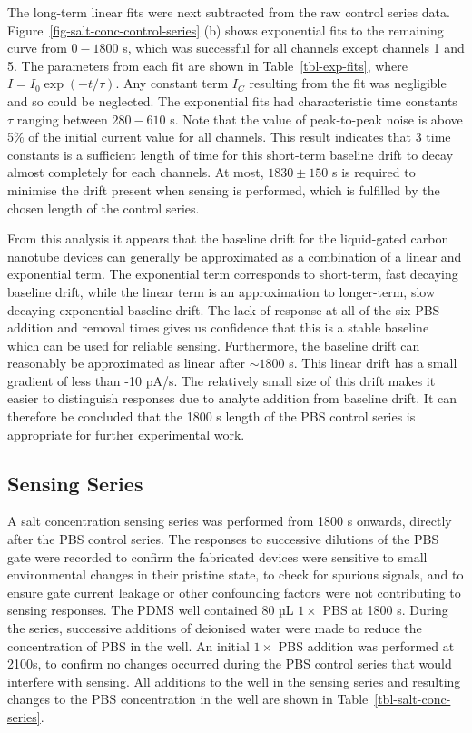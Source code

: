 \documentclass[
  a4paper,
]{scrbook}
\begin{document}
The long-term linear fits were next subtracted from the raw control
series data. Figure~\ref{fig-salt-conc-control-series} (b) shows
exponential fits to the remaining curve from \(0-1800\) s, which was
successful for all channels except channels 1 and 5. The parameters from
each fit are shown in Table~\ref{tbl-exp-fits}, where
\(I = I_0\exp(-t/\tau)\). Any constant term \(I_C\) resulting from the
fit was negligible and so could be neglected. The exponential fits had
characteristic time constants \(\tau\) ranging between \(280 - 610\) s.
Note that the value of peak-to-peak noise is above 5\% of the initial
current value for all channels. This result indicates that 3 time
constants is a sufficient length of time for this short-term baseline
drift to decay almost completely for each channels. At most,
\(1830\pm150\) s is required to minimise the drift present when sensing
is performed, which is fulfilled by the chosen length of the control
series.

From this analysis it appears that the baseline drift for the
liquid-gated carbon nanotube devices can generally be approximated as a
combination of a linear and exponential term. The exponential term
corresponds to short-term, fast decaying baseline drift, while the
linear term is an approximation to longer-term, slow decaying
exponential baseline drift. The lack of response at all of the six PBS
addition and removal times gives us confidence that this is a stable
baseline which can be used for reliable sensing. Furthermore, the
baseline drift can reasonably be approximated as linear after
\(\sim 1800\) s. This linear drift has a small gradient of less than -10
pA/s. The relatively small size of this drift makes it easier to
distinguish responses due to analyte addition from baseline drift. It
can therefore be concluded that the 1800 s length of the PBS control
series is appropriate for further experimental work.

\hypertarget{sec-salt-conc-series}{%
\subsection{Sensing Series}\label{sec-salt-conc-series}}

A salt concentration sensing series was performed from 1800 s onwards,
directly after the PBS control series. The responses to successive
dilutions of the PBS gate were recorded to confirm the fabricated
devices were sensitive to small environmental changes in their pristine
state, to check for spurious signals, and to ensure gate current leakage
or other confounding factors were not contributing to sensing responses.
The PDMS well contained 80 µL \(1 \times\) PBS at 1800 s. During the
series, successive additions of deionised water were made to reduce the
concentration of PBS in the well. An initial \(1 \times\) PBS addition
was performed at 2100s, to confirm no changes occurred during the PBS
control series that would interfere with sensing. All additions to the
well in the sensing series and resulting changes to the PBS
concentration in the well are shown in Table~\ref{tbl-salt-conc-series}.
\end{document}
